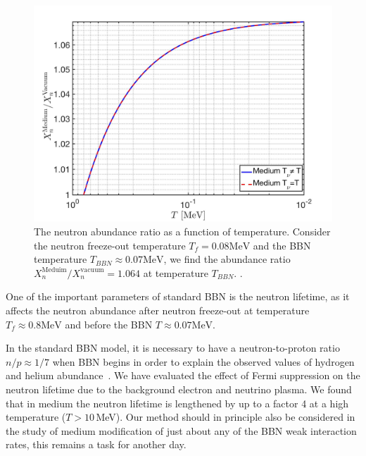 \begin{figure} 
\centerline{\includegraphics[width=0.9\linewidth]{./plots/Neutron_Abundance}}
\caption{The neutron abundance ratio as a function of temperature. Consider the neutron freeze-out temperature $T_f=0.08\mathrm{MeV}$ and the BBN temperature $T_{BBN}\approx0.07\mathrm{MeV}$, we find the abundance ratio ${X_n^{\mathrm{Meduim}}}/{X_n^{\mathrm{vacuum}}}=1.064$ at temperature $T_{BBN}$. .}
\label{Neutron:Abundance} 
\end{figure}

One of the important parameters of standard BBN is the neutron lifetime, as it affects the neutron abundance after neutron freeze-out at temperature $T_f\approx 0.8 \mathrm{MeV}$ and before the BBN $T\approx0.07 \mathrm{MeV}$. 

In the standard BBN model, it is necessary to have a neutron-to-proton ratio $n/p\approx1/7$ when BBN begins in order to explain the observed values of hydrogen and helium abundance~\cite{Pitrou:2018cgg}. We have evaluated the effect of Fermi suppression on the neutron lifetime due to the background electron and neutrino plasma. We found that in medium the neutron lifetime is lengthened by up to a factor 4 at a high temperature ($T>10$\,MeV). Our method should in principle also be considered in the study of medium modification of just about any of the BBN weak interaction rates, this remains a task for another day.

